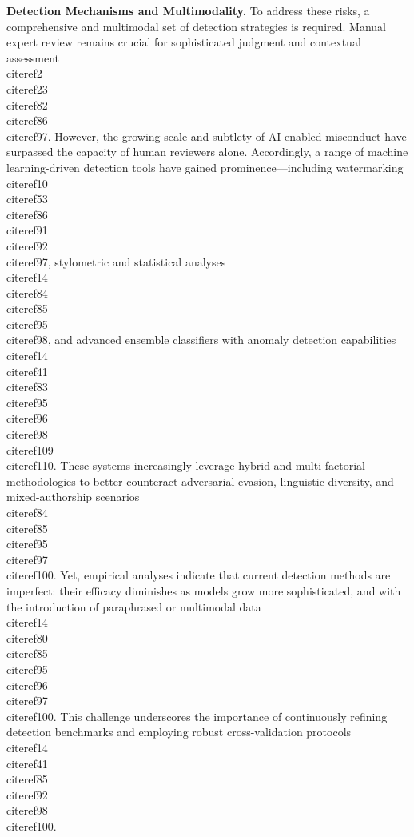 \documentclass[11pt]{article}
\begin{document}
\textbf{Detection Mechanisms and Multimodality.}  
To address these risks, a comprehensive and multimodal set of detection strategies is required. Manual expert review remains crucial for sophisticated judgment and contextual assessment \\cite{ref2}\\cite{ref23}\\cite{ref82}\\cite{ref86}\\cite{ref97}. However, the growing scale and subtlety of AI-enabled misconduct have surpassed the capacity of human reviewers alone. Accordingly, a range of machine learning-driven detection tools have gained prominence—including watermarking \\cite{ref10}\\cite{ref53}\\cite{ref86}\\cite{ref91}\\cite{ref92}\\cite{ref97}, stylometric and statistical analyses \\cite{ref14}\\cite{ref84}\\cite{ref85}\\cite{ref95}\\cite{ref98}, and advanced ensemble classifiers with anomaly detection capabilities \\cite{ref14}\\cite{ref41}\\cite{ref83}\\cite{ref95}\\cite{ref96}\\cite{ref98}\\cite{ref109}\\cite{ref110}. These systems increasingly leverage hybrid and multi-factorial methodologies to better counteract adversarial evasion, linguistic diversity, and mixed-authorship scenarios \\cite{ref84}\\cite{ref85}\\cite{ref95}\\cite{ref97}\\cite{ref100}. Yet, empirical analyses indicate that current detection methods are imperfect: their efficacy diminishes as models grow more sophisticated, and with the introduction of paraphrased or multimodal data \\cite{ref14}\\cite{ref80}\\cite{ref85}\\cite{ref95}\\cite{ref96}\\cite{ref97}\\cite{ref100}. This challenge underscores the importance of continuously refining detection benchmarks and employing robust cross-validation protocols \\cite{ref14}\\cite{ref41}\\cite{ref85}\\cite{ref92}\\cite{ref98}\\cite{ref100}.
\end{document}
